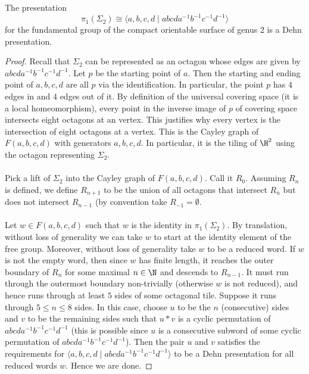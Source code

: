 \documentclass[a4paper]{article}
\begin{document}
\begin{prp}{}{} The presentation $$\pi_1(\Sigma_2)\cong\langle a,b,c,d\;|\;abcda^{-1}b^{-1}c^{-1}d^{-1}\rangle$$ for the fundamental group of the compact orientable surface of genus $2$ is a Dehn presentation. \tcbline
\begin{proof}
Recall that $\Sigma_2$ can be represented as an octagon whose edges are given by $abcda^{-1}b^{-1}c^{-1}d^{-1}$. Let $p$ be the starting point of $a$. Then the starting and ending point of $a,b,c,d$ are all $p$ via the identification. In particular, the point $p$ has $4$ edges in and $4$ edges out of it. By definition of the universal covering space (it is a local homeomorphism), every point in the inverse image of $p$ of covering space intersects eight octagons at an vertex. This justifies why every vertex is the intersection of eight octagons at a vertex. This is the Cayley graph of $F(a,b,c,d)$ with generators $a,b,c,d$. In particular, it is the tiling of $\H^2$ using the octagon representing $\Sigma_2$. \\~\\

Pick a lift of $\Sigma_2$ into the Cayley graph of $F(a,b,c,d)$. Call it $R_0$. Assuming $R_n$ is defined, we define $R_{n+1}$ to be the union of all octagons that intersect $R_n$ but does not intersect $R_{n-1}$ (by convention take $R_{-1}=\emptyset$. \\~\\

Let $w\in F(a,b,c,d)$ such that $w$ is the identity in $\pi_1(\Sigma_2)$. By translation, without loss of generality we can take $w$ to start at the identity element of the free group. Moreover, without loss of generality take $w$ to be a reduced word. If $w$ is not the empty word, then since $w$ has finite length, it reaches the outer boundary of $R_n$ for some maximal $n\in\N$ and descends to $R_{n-1}$. It must run through the outermost boundary non-trivially (otherwise $w$ is not reduced), and hence runs through at least $5$ sides of some octagonal tile. Suppose it runs through $5\leq n\leq 8$ sides. In this case, choose $u$ to be the $n$ (consecutive) sides and $v$ to be the remaining sides such that $u\ast v$ is a cyclic permutation of $abcda^{-1}b^{-1}c^{-1}d^{-1}$ (this is possible since $u$ is a consecutive subword of some cyclic permutation of $abcda^{-1}b^{-1}c^{-1}d^{-1}$). Then the pair $u$ and $v$ satisfies the requirements for $\langle a,b,c,d\;|\;abcda^{-1}b^{-1}c^{-1}d^{-1}\rangle$ to be a Dehn presentation for all reduced words $w$. Hence we are done. 
\end{proof}
\end{prp}
\end{document}
